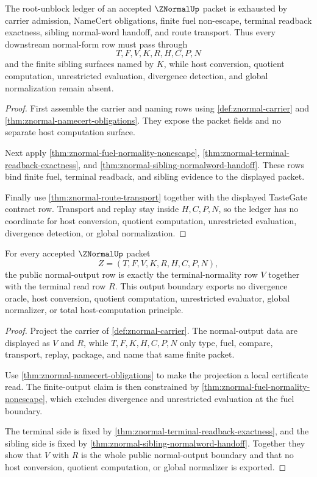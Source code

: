 \begin{theorem}
\label{thm:znormal-root-unblock-nonescape-ledger}
The root-unblock ledger of an accepted $\ZNormalUp$ packet is exhausted by carrier admission, NameCert obligations, finite fuel non-escape, terminal readback exactness, sibling normal-word handoff, and route transport. Thus every downstream normal-form row must pass through
$$
T,F,V,K,R,H,C,P,N
$$
and the finite sibling surfaces named by $K$, while host conversion, quotient computation, unrestricted evaluation, divergence detection, and global normalization remain absent.
\end{theorem}
\begin{proof}
First assemble the carrier and naming rows using \autoref{def:znormal-carrier} and \autoref{thm:znormal-namecert-obligations}. They expose the packet fields and no separate host computation surface.

Next apply \autoref{thm:znormal-fuel-normality-nonescape}, \autoref{thm:znormal-terminal-readback-exactness}, and \autoref{thm:znormal-sibling-normalword-handoff}. These rows bind finite fuel, terminal readback, and sibling evidence to the displayed packet.

Finally use \autoref{thm:znormal-route-transport} together with the displayed TasteGate contract row. Transport and replay stay inside $H,C,P,N$, so the ledger has no coordinate for host conversion, quotient computation, unrestricted evaluation, divergence detection, or global normalization.
\end{proof}

\begin{theorem}
\label{thm:znormal-normal-output-boundary}
For every accepted $\ZNormalUp$ packet
$$
Z=(T,F,V,K,R,H,C,P,N),
$$
the public normal-output row is exactly the terminal-normality row $V$ together with the terminal read row $R$. This output boundary exports no divergence oracle, host conversion, quotient computation, unrestricted evaluator, global normalizer, or total host-computation principle.
\end{theorem}
\begin{proof}
Project the carrier of \autoref{def:znormal-carrier}. The normal-output data are displayed as $V$ and $R$, while $T,F,K,H,C,P,N$ only type, fuel, compare, transport, replay, package, and name that same finite packet.

Use \autoref{thm:znormal-namecert-obligations} to make the projection a local certificate read. The finite-output claim is then constrained by \autoref{thm:znormal-fuel-normality-nonescape}, which excludes divergence and unrestricted evaluation at the fuel boundary.

The terminal side is fixed by \autoref{thm:znormal-terminal-readback-exactness}, and the sibling side is fixed by \autoref{thm:znormal-sibling-normalword-handoff}. Together they show that $V$ with $R$ is the whole public normal-output boundary and that no host conversion, quotient computation, or global normalizer is exported.
\end{proof}

